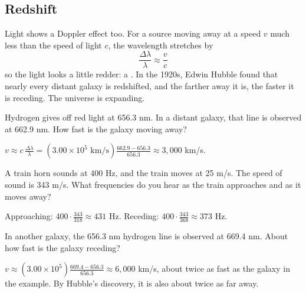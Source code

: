 \subsection{Redshift}
Light shows a Doppler effect too. For a source moving away at a speed $v$ much less than the speed of light $c$, the
wavelength stretches by
$$\frac{\Delta\lambda}{\lambda} \approx \frac{v}{c}$$
so the light looks a little redder: a . In the 1920s, Edwin Hubble found that nearly every distant galaxy
is redshifted, and the farther away it is, the faster it is receding. The universe is expanding.

\begin{Worked}
\begin{Problem}
Hydrogen gives off red light at 656.3 nm. In a distant galaxy, that line is observed at 662.9 nm. How
fast is the galaxy moving away?
\end{Problem}
\begin{Solution}
$v \approx c\,\frac{\Delta\lambda}{\lambda} = (3.00 \times 10^5 \text{ km/s})\frac{662.9 - 656.3}{656.3} \approx 3{,}000$ km/s.
\end{Solution}
\end{Worked}

\begin{Exercise}[title={A Passing Train}, label=wv_train]
A train horn sounds at 400 Hz, and the train moves at 25 m/s. The speed of sound is 343 m/s. What frequencies do you
hear as the train approaches and as it moves away?
\end{Exercise}
\begin{Answer}[ref=wv_train]
Approaching: $400 \cdot \frac{343}{318} \approx 431$ Hz. Receding: $400 \cdot \frac{343}{368} \approx 373$ Hz.
\end{Answer}

\begin{Exercise}[title={A Faster Galaxy}, label=wv_galaxy]
In another galaxy, the 656.3 nm hydrogen line is observed at 669.4 nm. About how fast is the galaxy receding?
\end{Exercise}
\begin{Answer}[ref=wv_galaxy]
$v \approx (3.00 \times 10^5)\frac{669.4 - 656.3}{656.3} \approx 6{,}000$ km/s, about twice as fast as the galaxy in the
example. By Hubble's discovery, it is also about twice as far away.
\end{Answer}
